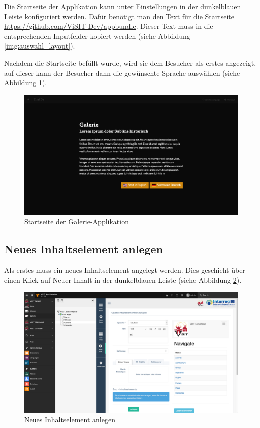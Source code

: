 Die Startseite der Applikation kann unter Einstellungen in der dunkelblauen Leiste konfiguriert werden. Dafür benötigt man den Text für die Startseite \url{https://github.com/ViSIT-Dev/appbundle}. Dieser Text muss in die entsprechenden Inputfelder kopiert werden (siehe Abbildung \ref{img:auswahl_layout}).


Nachdem die Startseite befüllt wurde, wird sie dem Besucher als erstes angezeigt, auf dieser kann der Besucher dann die gewünschte Sprache auswählen (siehe Abbildung \ref{img:startseite}).

\begin{figure}[ht!]
\centering
\includegraphics[width=12cm]{Figures/paula/galerie/startseite.png}
\caption{Startseite der Galerie-Applikation}
\label{img:startseite}
\end{figure}



\subsection{Neues Inhaltselement anlegen}

Als erstes muss ein neues Inhaltselement angelegt werden. Dies geschieht über einen Klick auf Neuer Inhalt in der dunkelblauen Leiste (siehe Abbildung \ref{img:neues_inhaltselement_anlegen}).

\begin{figure}[ht!]
\centering
\includegraphics[width=12cm]{Figures/paula/galerie/neues_inhaltselement_anlegen.png}
\caption{Neues Inhaltselement anlegen}
\label{img:neues_inhaltselement_anlegen}
\end{figure}

